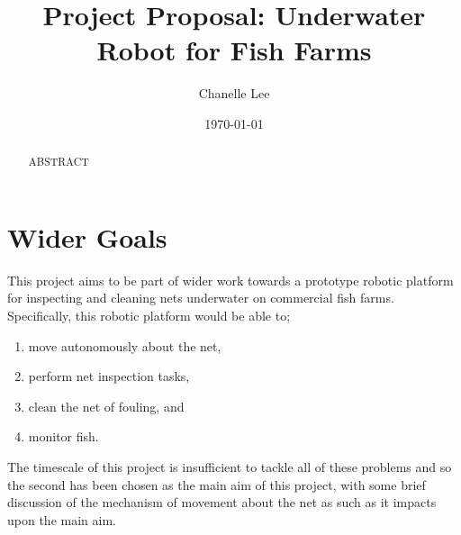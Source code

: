 \documentclass[11.5pt, twoside, a4paper]{article}
\begin{document}
\title{Project Proposal: Underwater Robot for Fish Farms}
\author{Chanelle Lee}
\date{\today}
\maketitle

\begin{abstract}
ABSTRACT
\end{abstract}

\section{Wider Goals}
This project aims to be part of wider work towards a prototype robotic platform for inspecting and cleaning nets underwater on commercial fish farms. Specifically, this robotic platform would be able to;
\begin{enumerate}
\item move autonomously about the net,
\item perform net inspection tasks,
\item clean the net of fouling, and
\item monitor fish.
\end{enumerate}
The timescale of this project is insufficient to tackle all of these problems and so the second has been chosen as the main aim of this project, with some brief discussion of the mechanism of movement about the net as such as it impacts upon the main aim.
\end{document}
